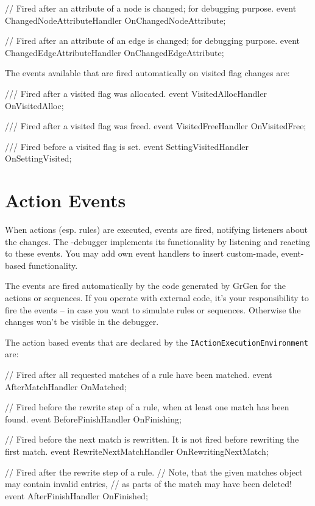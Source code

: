 \begin{csharplet}
// Fired after an attribute of a node is changed; for debugging purpose.
event ChangedNodeAttributeHandler OnChangedNodeAttribute;

// Fired after an attribute of an edge is changed; for debugging purpose.
event ChangedEdgeAttributeHandler OnChangedEdgeAttribute;
\end{csharplet}

The events available that are fired automatically on visited flag changes are:

\begin{csharplet}
/// Fired after a visited flag was allocated.
event VisitedAllocHandler OnVisitedAlloc;

/// Fired after a visited flag was freed.
event VisitedFreeHandler OnVisitedFree;

/// Fired before a visited flag is set.
event SettingVisitedHandler OnSettingVisited;
\end{csharplet}

\section{Action Events}\label{sec:actionevent}

When actions (esp. rules) are executed, events are fired, notifying listeners about the changes.
The \GrShell-debugger implements its functionality by listening and reacting to these events.
You may add own event handlers to insert custom-made, event-based functionality.

The events are fired automatically by the code generated by GrGen for the actions or sequences.
If you operate with external code, it's your responsibility to fire the events -- in case you want to simulate rules or sequences.
Otherwise the changes won't be visible in the debugger.

The action based events that are declared by the \texttt{IActionExecutionEnvironment} are:

\begin{csharplet}
// Fired after all requested matches of a rule have been matched.
event AfterMatchHandler OnMatched;

// Fired before the rewrite step of a rule, when at least one match has been found.
event BeforeFinishHandler OnFinishing;

// Fired before the next match is rewritten. It is not fired before rewriting the first match.
event RewriteNextMatchHandler OnRewritingNextMatch;

// Fired after the rewrite step of a rule.
// Note, that the given matches object may contain invalid entries,
// as parts of the match may have been deleted!
event AfterFinishHandler OnFinished;
\end{csharplet}

